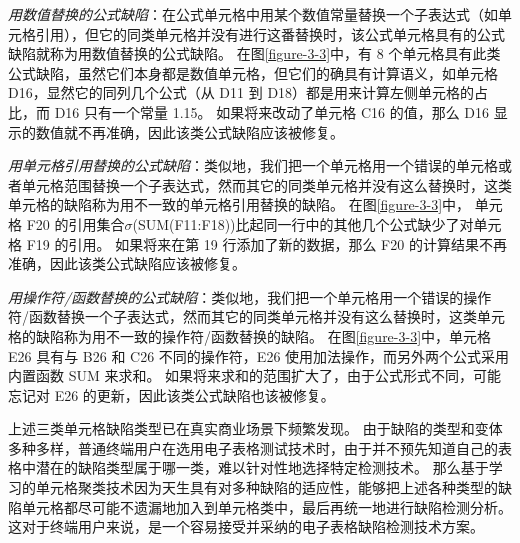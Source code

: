 \begin{definition}
   \textit{用数值替换的公式缺陷}：在公式单元格中用某个数值常量替换一个子表达式（如单元格引用），但它的同类单元格并没有进行这番替换时，该公式单元格具有的公式缺陷就称为用数值替换的公式缺陷。
   在图\ref{figure-3-3}中，有 8 个单元格具有此类公式缺陷，虽然它们本身都是数值单元格，但它们的确具有计算语义，如单元格 D16，显然它的同列几个公式（从 D11 到 D18）都是用来计算左侧单元格的占比，而 D16 只有一个常量 1.15。
   如果将来改动了单元格 C16 的值，那么 D16 显示的数值就不再准确，因此该类公式缺陷应该被修复。
\end{definition}

\begin{definition}
    \textit{用单元格引用替换的公式缺陷}：类似地，我们把一个单元格用一个错误的单元格或者单元格范围替换一个子表达式，然而其它的同类单元格并没有这么替换时，这类单元格的缺陷称为用不一致的单元格引用替换的缺陷。
    在图\ref{figure-3-3}中， 单元格 F20 的引用集合$\sigma$(SUM(F11:F18))比起同一行中的其他几个公式缺少了对单元格 F19 的引用。
    如果将来在第 19 行添加了新的数据，那么 F20 的计算结果不再准确，因此该类公式缺陷应该被修复。
\end{definition}

\begin{definition}
    \textit{用操作符/函数替换的公式缺陷}：类似地，我们把一个单元格用一个错误的操作符/函数替换一个子表达式，然而其它的同类单元格并没有这么替换时，这类单元格的缺陷称为用不一致的操作符/函数替换的缺陷。
    在图\ref{figure-3-3}中，单元格 E26 具有与 B26 和 C26 不同的操作符，E26 使用加法操作，而另外两个公式采用内置函数 SUM 来求和。
    如果将来求和的范围扩大了，由于公式形式不同，可能忘记对 E26 的更新，因此该类公式缺陷也该被修复。
\end{definition}

上述三类单元格缺陷类型已在真实商业场景下频繁发现\cite{panko2006facing,powell2008critical}。
由于缺陷的类型和变体多种多样，普通终端用户在选用电子表格测试技术时，由于并不预先知道自己的表格中潜在的缺陷类型属于哪一类，难以针对性地选择特定检测技术。
那么基于学习的单元格聚类技术因为天生具有对多种缺陷的适应性，能够把上述各种类型的缺陷单元格都尽可能不遗漏地加入到单元格类中，最后再统一地进行缺陷检测分析。
这对于终端用户来说，是一个容易接受并采纳的电子表格缺陷检测技术方案。

